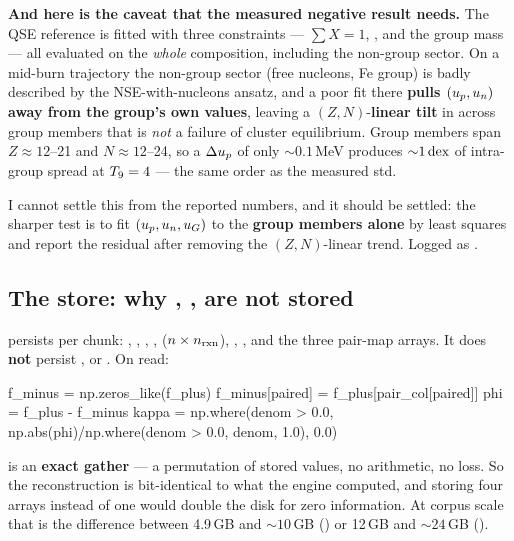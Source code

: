 \begin{warn}
\textbf{And here is the caveat that the measured negative result needs.} The QSE
reference is fitted with three constraints --- $\sum X = 1$, \Ye, and the group
mass --- all evaluated on the \emph{whole} composition, including the non-group
sector. On a mid-burn trajectory the non-group sector (free nucleons, Fe group)
is badly described by the NSE-with-nucleons ansatz, and a poor fit there
\textbf{pulls $(u_{p}, u_{n})$ away from the group's own values}, leaving a
$(Z, N)$-\textbf{linear tilt} in \rQSE{} across group members that is \emph{not}
a failure of cluster equilibrium. Group members span $Z \approx 12$--21 and
$N \approx 12$--24, so a $\Delta u_{p}$ of only ${\sim}0.1$\,MeV produces
${\sim}1\,\text{dex}$ of intra-group spread at $T_{9} = 4$ --- the same order as the
measured std.\derivedhere
\end{warn}

I cannot settle this from the reported numbers, and it should be settled: the
sharper test is to fit $(u_{p}, u_{n}, u_{G})$ to the \textbf{group members alone} by
least squares and report the residual after removing the $(Z, N)$-linear trend.
Logged as .

\subsection{The store: why \texorpdfstring{\fm}{f-}, \texorpdfstring{\netflux}{phi},
            \texorpdfstring{\kap}{kappa} are not stored}
\label{sec:store}

 persists per chunk: , ,
, ,  ($n \times n_{\rm rxn}$), ,
, and the three pair-map arrays. It does \textbf{not} persist
\fm, \netflux{} or \kap. On read:

\begin{srclisting}
f_minus = np.zeros_like(f_plus)
f_minus[paired] = f_plus[pair_col[paired]]
phi   = f_plus - f_minus
kappa = np.where(denom > 0.0, np.abs(phi)/np.where(denom > 0.0, denom, 1.0), 0.0)
\end{srclisting}

 is an \textbf{exact gather} --- a
permutation of stored values, no arithmetic, no loss. So the reconstruction is
bit-identical to what the engine computed, and storing four arrays instead of
one would double the disk for zero information. At corpus scale that is the
difference between 4.9\,GB and ${\sim}10$\,GB () or 12\,GB and
${\sim}24$\,GB (). 


